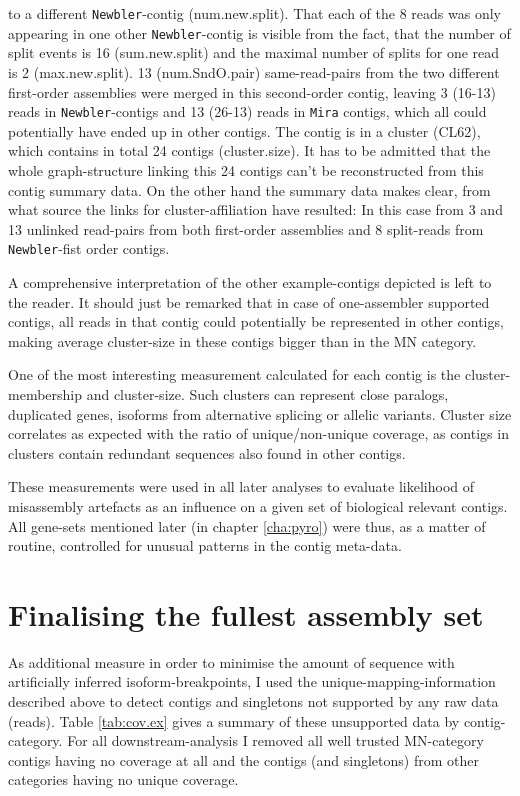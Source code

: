 to a different \texttt{Newbler}-contig (num.new.split). That each of
the 8 reads was only appearing in one other \texttt{Newbler}-contig is
visible from the fact, that the number of split events is 16
(sum.new.split) and the maximal number of splits for one read is 2
(max.new.split). 13 (num.SndO.pair) same-read-pairs from the two
different first-order assemblies were merged in this second-order
contig, leaving 3 (16-13) reads in \texttt{Newbler}-contigs and 13
(26-13) reads in \texttt{Mira} contigs, which all could potentially
have ended up in other contigs. The contig is in a cluster (CL62),
which contains in total 24 contigs (cluster.size). It has to be
admitted that the whole graph-structure linking this 24 contigs can't
be reconstructed from this contig summary data. On the other hand the
summary data makes clear, from what source the links for
cluster-affiliation have resulted: In this case from 3 and 13 unlinked
read-pairs from both first-order assemblies and 8 split-reads from
\texttt{Newbler}-fist order contigs.

A comprehensive interpretation of the other example-contigs depicted
is left to the reader. It should just be remarked that in case of
one-assembler supported contigs, all reads in that contig could
potentially be represented in other contigs, making average
cluster-size in these contigs bigger than in the MN category.

One of the most interesting measurement calculated for each contig is
the cluster-membership and cluster-size. Such clusters can represent
close paralogs, duplicated genes, isoforms from alternative splicing
or allelic variants. Cluster size correlates as expected with the
ratio of unique/non-unique coverage, as contigs in clusters contain
redundant sequences also found in other contigs.

These measurements were used in all later analyses to evaluate
likelihood of misassembly artefacts as an influence on a given set of
biological relevant contigs. All gene-sets mentioned later (in chapter
\ref{cha:pyro}) were thus, as a matter of routine, controlled for
unusual patterns in the contig meta-data.

\section{Finalising the fullest assembly set}
\label{sec:final-full-assembly}

As additional measure in order to minimise the amount of sequence with
artificially inferred isoform-breakpoints, I used the
unique-mapping-information described above to detect contigs and
singletons not supported by any raw data (reads). Table
\ref{tab:cov.ex} gives a summary of these unsupported data by
contig-category. For all downstream-analysis I removed all well
trusted MN-category contigs having no coverage at all and the contigs
(and singletons) from other categories having no unique coverage.


